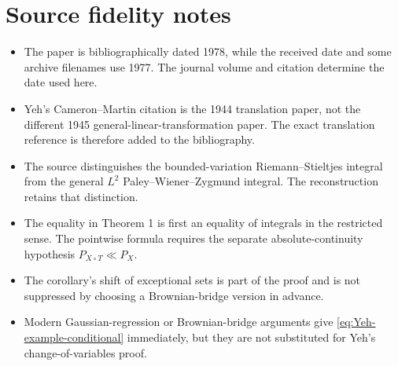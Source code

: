 \section*{Source fidelity notes}
\begin{itemize}[leftmargin=2em]
\item The paper is bibliographically dated 1978, while the received date and some archive filenames use 1977.  The journal volume and citation determine the date used here.
\item Yeh's Cameron--Martin citation is the 1944 translation paper, not the different 1945 general-linear-transformation paper.  The exact translation reference is therefore added to the bibliography.
\item The source distinguishes the bounded-variation Riemann--Stieltjes integral from the general $L^2$ Paley--Wiener--Zygmund integral.  The reconstruction retains that distinction.
\item The equality in Theorem 1 is first an equality of integrals in the restricted sense.  The pointwise formula requires the separate absolute-continuity hypothesis $P_{X\circ T}\ll P_X$.
\item The corollary's shift of exceptional sets is part of the proof and is not suppressed by choosing a Brownian-bridge version in advance.
\item Modern Gaussian-regression or Brownian-bridge arguments give \eqref{eq:Yeh-example-conditional} immediately, but they are not substituted for Yeh's change-of-variables proof.
\end{itemize}




